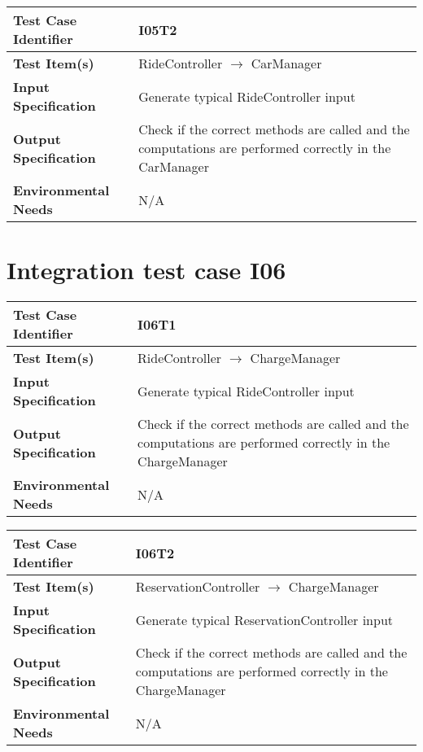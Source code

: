 \begin{center}
	\vspace{0.6cm}
	\begin{tabular}{|l|p{10cm}|}
		\hline
		\textbf{Test Case Identifier} & I05T2 \bigstrut \\\hline
		\textbf{Test Item(s)} & RideController \ensuremath{\rightarrow} CarManager \bigstrut \\\hline
		\textbf{Input Specification} & Generate typical RideController input \bigstrut \\\hline
		\textbf{Output Specification} & Check if the correct methods are called and the computations are performed correctly in the CarManager \bigstrut \\\hline
		\textbf{Environmental Needs} & N/A \bigstrut \\\hline
	\end{tabular}
\end{center}

\section{Integration test case I06}\label{I06}
\begin{center}
	\vspace{0.6cm}
	\begin{tabular}{|l|p{10cm}|}
		\hline
		\textbf{Test Case Identifier} & I06T1 \bigstrut \\\hline
		\textbf{Test Item(s)} & RideController \ensuremath{\rightarrow} ChargeManager \bigstrut \\\hline
		\textbf{Input Specification} & Generate typical RideController input \bigstrut \\\hline
		\textbf{Output Specification} & Check if the correct methods are called and the computations are performed correctly in the ChargeManager \bigstrut \\\hline
		\textbf{Environmental Needs} & N/A \bigstrut \\\hline
	\end{tabular}
\end{center}

\begin{center}
	\vspace{0.6cm}
	\begin{tabular}{|l|p{10cm}|}
		\hline
		\textbf{Test Case Identifier} & I06T2 \bigstrut \\\hline
		\textbf{Test Item(s)} & ReservationController \ensuremath{\rightarrow} ChargeManager \bigstrut \\\hline
		\textbf{Input Specification} & Generate typical ReservationController input \bigstrut \\\hline
		\textbf{Output Specification} & Check if the correct methods are called and the computations are performed correctly in the ChargeManager \bigstrut \\\hline
		\textbf{Environmental Needs} & N/A \bigstrut \\\hline
	\end{tabular}
\end{center}

